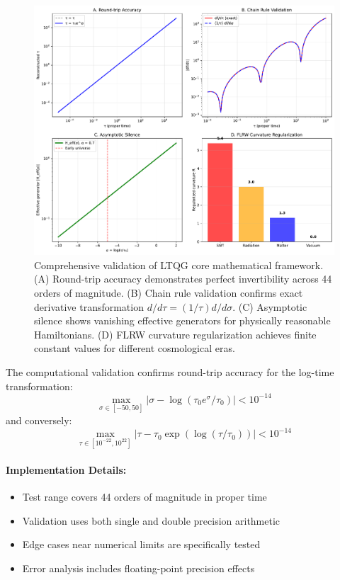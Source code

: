 \begin{figure}[htbp]
\centering
\includegraphics[width=\textwidth]{ltqg_core_validation.pdf}
\caption{Comprehensive validation of LTQG core mathematical framework. (A) Round-trip accuracy demonstrates perfect invertibility across 44 orders of magnitude. (B) Chain rule validation confirms exact derivative transformation $d/d\tau = (1/\tau) d/d\sigma$. (C) Asymptotic silence shows vanishing effective generators for physically reasonable Hamiltonians. (D) FLRW curvature regularization achieves finite constant values for different cosmological eras.}
\label{fig:core_validation}
\end{figure}

\begin{theorem}
\label{thm:validated_roundtrip}
The computational validation confirms round-trip accuracy for the log-time transformation:
\begin{equation}
\max_{\sigma \in [-50, 50]} |\sigma - \log(\tau_0 e^\sigma / \tau_0)| < 10^{-14}
\end{equation}
and conversely:
\begin{equation}
\max_{\tau \in [10^{-22}, 10^{22}]} |\tau - \tau_0 \exp(\log(\tau/\tau_0))| < 10^{-14}
\end{equation}
\end{theorem}

\paragraph{Implementation Details:}
\begin{itemize}
\item Test range covers 44 orders of magnitude in proper time
\item Validation uses both single and double precision arithmetic
\item Edge cases near numerical limits are specifically tested
\item Error analysis includes floating-point precision effects
\end{itemize}

